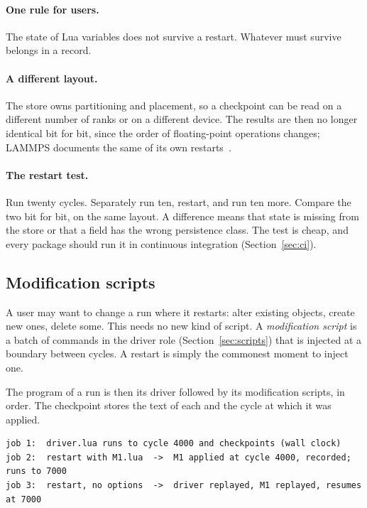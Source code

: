 \documentclass[11pt,a4paper]{article}
\begin{document}
\paragraph{One rule for users.}  The state of Lua variables does not
survive a restart.  Whatever must survive belongs in a record.

\paragraph{A different layout.}  The store owns partitioning and placement,
so a checkpoint can be read on a different number of ranks or on a
different device.  The results are then no longer identical bit for bit,
since the order of floating-point operations changes; LAMMPS documents the
same of its own restarts~\cite{lammpsrestart}.

\paragraph{The restart test.}  Run twenty cycles.  Separately run ten,
restart, and run ten more.  Compare the two bit for bit, on the same layout.
A difference means that state is missing from the store or that a field has
the wrong persistence class.  The test is cheap, and every package should
run it in continuous integration (Section~\ref{sec:ci}).

\subsection{Modification scripts}
\label{sec:modification}

A user may want to change a run where it restarts: alter existing objects,
create new ones, delete some.  This needs no new kind of script.  A
\emph{modification script} is a batch of commands in the driver role
(Section~\ref{sec:scripts}) that is injected at a boundary between cycles.
A restart is simply the commonest moment to inject one.

The program of a run is then its driver followed by its modification
scripts, in order.  The checkpoint stores the text of each and the cycle at
which it was applied.

\begin{lstlisting}
job 1:  driver.lua runs to cycle 4000 and checkpoints (wall clock)
job 2:  restart with M1.lua  ->  M1 applied at cycle 4000, recorded; runs to 7000
job 3:  restart, no options  ->  driver replayed, M1 replayed, resumes at 7000
\end{lstlisting}
\end{document}
